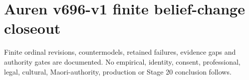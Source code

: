\documentclass{article}
\begin{document}
\section*{Auren v696-v1 finite belief-change closeout}
Finite ordinal revisions, countermodels, retained failures, evidence gaps and authority gates are documented. No empirical, identity, consent, professional, legal, cultural, Maori-authority, production or Stage 20 conclusion follows.
\end{document}
